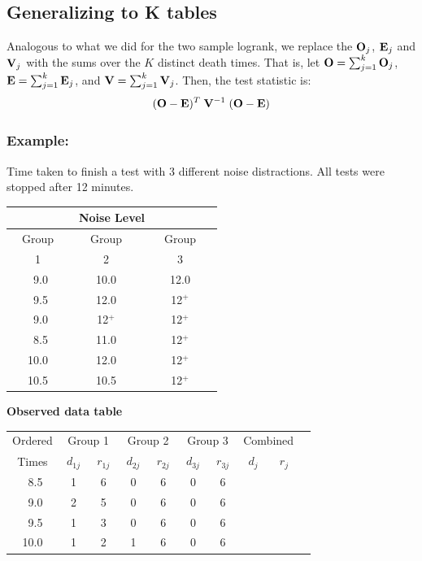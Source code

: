 \documentclass[11pt,slidesonly,semrot,portrait,palatino]{book}
\begin{document}
{\subsection{Generalizing to K tables}
Analogous to what we did for the two sample logrank, we replace the
$ {\bf O}_j$, ${\bf E}_j$ and ${\bf V}_j$ with the sums over the
$K$ distinct death times. That is, let
 $ {\bf O} = \sum_{j=1}^{k}  {\bf O}_j$,
 $ {\bf E} = \sum_{j=1}^{k}  {\bf E}_j$, and
 $ {\bf V} = \sum_{j=1}^{k}  {\bf V}_j$.  Then, the test
statistic is:
 \[
 ( {\bf O} - {\bf E})^T \; {\bf V}^{-1} \; ( {\bf O} - {\bf E})
\]
\subsubsection{Example: }
Time taken to finish a test with 3 different noise distractions.
All tests were stopped after 12 minutes. \\[2ex]
\begin{center}
\begin{tabular}{ccc}
\hline \hline
 \multicolumn{3}{c}{Noise Level}\\ \hline
Group & Group & Group \\
~~~~1~~~~ & ~~~~~2~~~~~ & ~~~~~3~~~~~ \\ \hline
~9.0   & 10.0    &  12.0  \\
~9.5   & 12.0    &  12$^+$\\
~9.0   & 12$^+$  &  12$^+$\\
~8.5   & 11.0    &  12$^+$\\
10.0   & 12.0    &  12$^+$\\
10.5   & 10.5    &  12$^+$\\  \hline \hline
\end{tabular}
\newpage
{ \bf Observed data table}
\\[2ex]
\begin{tabular}{cccccccccc}
\hline
Ordered     & \multicolumn{2}{c}{Group 1}& \multicolumn{2}{c}{Group 2}
&  \multicolumn{2}{c}{Group 3} &\multicolumn{2}{c}{Combined}  \\
\cline{2-3} \cline{4-5} \cline{6-7}
Times & $~d_{1j}~$ & $~r_{1j}~$  & $~d_{2j}~$ & $~r_{2j}~$  &
$~d_{3j}~$ & $~r_{3j}~$  & $~d_{j}~$ & $~r_{j}~$ &\\ \hline
~8.5   & 1 & 6  & 0 & 6 & 0 & 6 \\
~9.0     & 2 & 5  & 0 & 6 & 0 & 6\\
~9.5   & 1 & 3  & 0 & 6 & 0 & 6\\
10.0    & 1 & 2  & 1 & 6 & 0 & 6\\

\end{tabular}
\end{center}}
\end{document}
